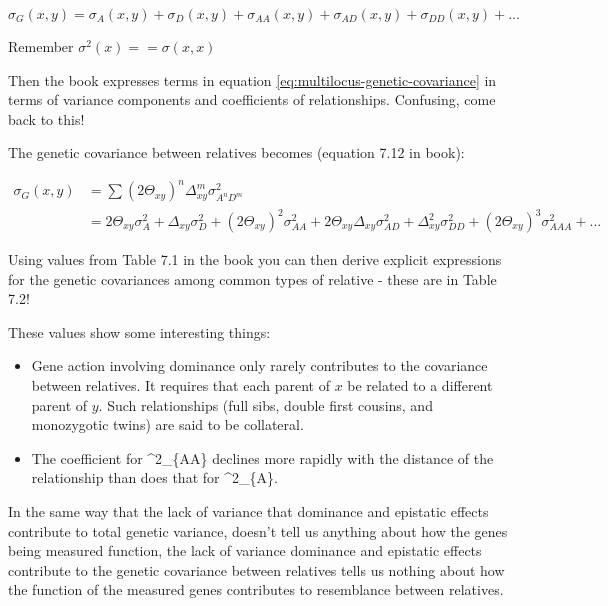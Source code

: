 \documentclass[
]{book}
\providecommand{\tightlist}{%
  \setlength{\itemsep}{0pt}\setlength{\parskip}{0pt}}
\begin{document}
\begin{equation}
  \sigma_G(x, y) = \sigma_A(x, y) + \sigma_D(x, y) + \sigma_{AA}(x, y) + \sigma_{AD}(x, y) + \sigma_{DD}(x, y) + ...
  \label{eq:multilocus-genetic-covariance}
\end{equation}

Remember \(\sigma^2(x) == \sigma(x,x)\)

Then the book expresses terms in equation \eqref{eq:multilocus-genetic-covariance} in terms of variance components and coefficients of relationships. Confusing, come back to this!

The genetic covariance between relatives becomes (equation 7.12 in book):

\begin{equation}
\begin{split}
  \sigma_{G}(x, y) &= \sum(2\Theta_{xy})^n \Delta^{m}_{xy}\sigma^2_{A^{n}D^{m}} \\
  & = 2\Theta_{xy}\sigma^2_A + \Delta_{xy}\sigma^2_{D} + (2\Theta_{xy})^2\sigma^2_{AA} + 2\Theta_{xy}\Delta_{xy}\sigma^2_{AD} + \Delta^2_{xy}\sigma^2_{DD} + (2\Theta_{xy})^3\sigma^2_{AAA} + ...
\end{split}
\label{eq:multilocus-genetic-covariance-relatives}
\end{equation}

Using values from Table 7.1 in the book you can then derive explicit expressions for the genetic covariances among common types of relative - these are in Table 7.2!

These values show some interesting things:

\begin{itemize}
\tightlist
\item
  Gene action involving dominance only rarely contributes to the covariance between relatives. It requires that each parent of \(x\) be related to a different parent of \(y\). Such relationships (full sibs, double first cousins, and monozygotic twins) are said to be collateral.
\item
  The coefficient for \sigma\^{}2\_\{AA\} declines more rapidly with the distance of the relationship than does that for \sigma\^{}2\_\{A\}.
\end{itemize}

In the same way that the lack of variance that dominance and epistatic effects contribute to total genetic variance, doesn't tell us anything about how the genes being measured function, the lack of variance dominance and epistatic effects contribute to the genetic covariance between relatives tells us nothing about how the function of the measured genes contributes to resemblance between relatives.
\end{document}
